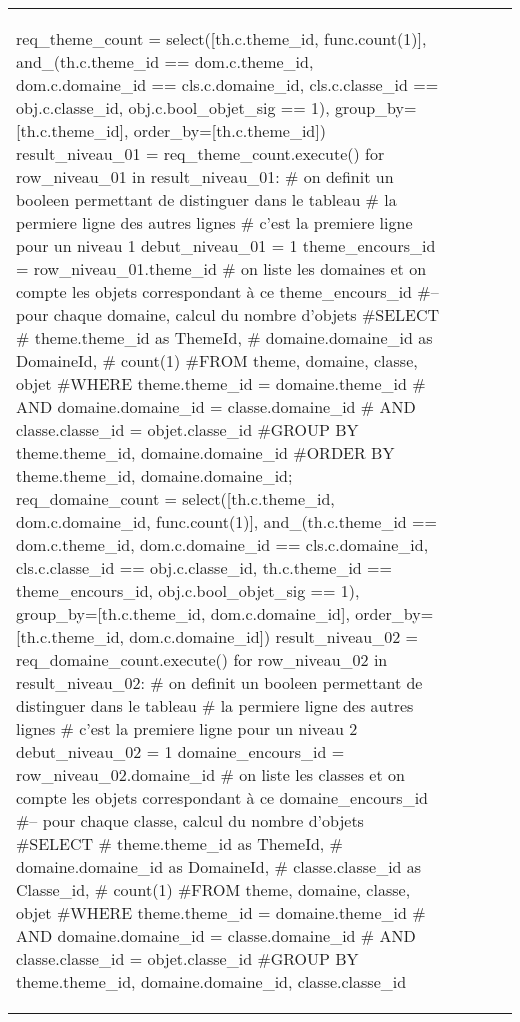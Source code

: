 \documentclass[12pt,titlepage]{book}
\begin{document}
\begin{supertabular}{|p{7.5cm}|p{7.5cm}|p{7.5cm}|c|p{10cm}|}
\begin{lbdpython}
req_theme_count = select([th.c.theme_id, func.count(1)],
                  and_(th.c.theme_id == dom.c.theme_id,
                       dom.c.domaine_id == cls.c.domaine_id,
                       cls.c.classe_id == obj.c.classe_id,
                       obj.c.bool_objet_sig == 1),
                  group_by=[th.c.theme_id],
                  order_by=[th.c.theme_id])
result_niveau_01 = req_theme_count.execute()
for row_niveau_01 in result_niveau_01:
   # on definit un booleen permettant de distinguer dans le tableau
   # la permiere ligne des autres lignes
   # c'est la premiere ligne pour un niveau 1
   debut_niveau_01 = 1
   theme_encours_id = row_niveau_01.theme_id
   # on liste les domaines et on compte les objets correspondant à ce theme_encours_id
   #-- pour chaque domaine, calcul du nombre d'objets
   #SELECT
   #   theme.theme_id as ThemeId,
   #   domaine.domaine_id as DomaineId,
   #   count(1)
   #FROM theme, domaine, classe, objet
   #WHERE theme.theme_id = domaine.theme_id
   #  AND domaine.domaine_id = classe.domaine_id
   #  AND classe.classe_id = objet.classe_id
   #GROUP BY theme.theme_id, domaine.domaine_id
   #ORDER BY theme.theme_id, domaine.domaine_id;
   req_domaine_count = select([th.c.theme_id, dom.c.domaine_id, func.count(1)],
                       and_(th.c.theme_id == dom.c.theme_id,
                            dom.c.domaine_id == cls.c.domaine_id,
                            cls.c.classe_id == obj.c.classe_id,
                            th.c.theme_id == theme_encours_id,
                            obj.c.bool_objet_sig == 1),
                       group_by=[th.c.theme_id, dom.c.domaine_id],
                       order_by=[th.c.theme_id, dom.c.domaine_id])
   result_niveau_02 = req_domaine_count.execute()
   for row_niveau_02 in result_niveau_02:
      # on definit un booleen permettant de distinguer dans le tableau
      # la permiere ligne des autres lignes
      # c'est la premiere ligne pour un niveau 2
      debut_niveau_02 = 1
      domaine_encours_id = row_niveau_02.domaine_id
      # on liste les classes et on compte les objets correspondant à ce domaine_encours_id
      #-- pour chaque classe, calcul du nombre d'objets
      #SELECT
      #   theme.theme_id as ThemeId,
      #   domaine.domaine_id as DomaineId,
      #   classe.classe_id as Classe_id,
      #   count(1)
      #FROM theme, domaine, classe, objet
      #WHERE theme.theme_id = domaine.theme_id 
      #  AND domaine.domaine_id = classe.domaine_id
      #  AND classe.classe_id = objet.classe_id
      #GROUP BY theme.theme_id, domaine.domaine_id, classe.classe_id

\end{lbdpython}
\end{supertabular}
\end{document}
